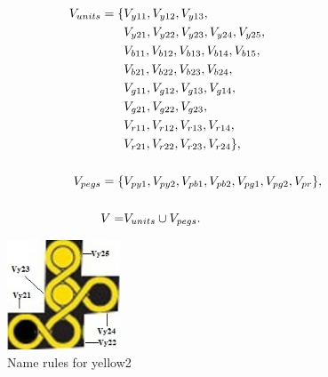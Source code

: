 \begin{equation}
\begin{aligned}
V_{units}=\{&V_{y11},V_{y12},V_{y13},\\&V_{y21},V_{y22},V_{y23},V_{y24},V_{y25},\\&V_{b11},V_{b12},V_{b13},V_{b14},
V_{b15},\\&V_{b21},V_{b22},V_{b23},V_{b24},\\&V_{g11},V_{g12},V_{g13},V_{g14},\\&V_{g21},V_{g22},V_{g23},\\&V_{r11},
V_{r12},V_{r13},V_{r14},\\&V_{r21},V_{r22},V_{r23},V_{r24}\},\\
\\V_{pegs} = \{&V_{py1}, V_{py2}, V_{pb1}, V_{pb2}, V_{pg1}, V_{pg2}, V_{pr}\},\\
\\V = &V_{units} \cup V_{pegs}.
\end{aligned}
\end{equation}
\begin{figure}[htbp]
    \centering
    \includegraphics[width=0.3\textwidth]{figs/example.jpg}
    \caption{Name rules for yellow2}
    \label{fig:namerules}
\end{figure}
